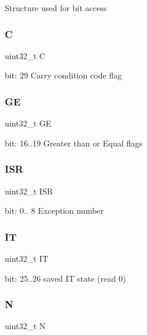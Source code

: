Structure used for bit access \mbox{\label{unionx_p_s_r___type_a7a1caf92f32fe9ebd8d1fe89b06c7776}} 
\subsubsection{\texorpdfstring{C}{C}}
{\footnotesize\ttfamily uint32\+\_\+t C}

bit\+: 29 Carry condition code flag \mbox{\label{unionx_p_s_r___type_aa91800ec6e90e457c7a1acd1f2e17099}} 
\subsubsection{\texorpdfstring{GE}{GE}}
{\footnotesize\ttfamily uint32\+\_\+t GE}

bit\+: 16..19 Greater than or Equal flags \mbox{\label{unionx_p_s_r___type_ad502ba7dbb2aab5f87c782b28f02622d}} 
\subsubsection{\texorpdfstring{ISR}{ISR}}
{\footnotesize\ttfamily uint32\+\_\+t I\+SR}

bit\+: 0.. 8 Exception number \mbox{\label{unionx_p_s_r___type_a76485660fe8ad98cdc71ddd7cb0ed777}} 
\subsubsection{\texorpdfstring{IT}{IT}}
{\footnotesize\ttfamily uint32\+\_\+t IT}

bit\+: 25..26 saved IT state (read 0) \mbox{\label{unionx_p_s_r___type_abae0610bc2a97bbf7f689e953e0b451f}} 
\subsubsection{\texorpdfstring{N}{N}}
{\footnotesize\ttfamily uint32\+\_\+t N}

